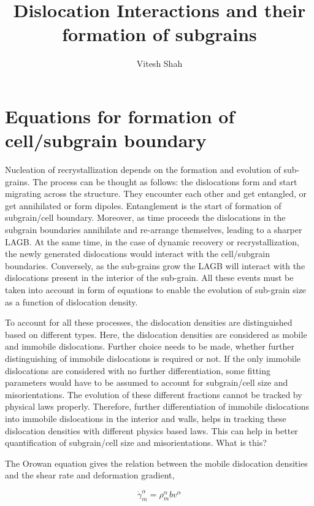 \documentclass[a4paper,11pt]{article}
\author{Vitesh Shah}
\title{Dislocation Interactions and their formation of subgrains}
\begin{document}
\maketitle
\section{Equations for formation of cell/subgrain boundary} \fussy

\par Nucleation of recrystallization depends on the formation and evolution of sub-grains. The process can be thought as follows: the dislocations form and start migrating across the structure. They encounter each other and get entangled, or get annihilated or form dipoles. Entanglement is the start of formation of subgrain/cell boundary. Moreover, as time proceeds the dislocations in the subgrain boundaries annihilate and re-arrange themselves, leading to a sharper LAGB. At the same time, in the case of dynamic recovery or recrystallization, the newly generated dislocations would interact with the cell/subgrain boundaries. Conversely, as the sub-grains grow the LAGB will interact with the dislocations present in the interior of the sub-grain. All these events must be taken into account in form of equations to enable the evolution of sub-grain size as a function of dislocation density. \par

To account for all these processes, the dislocation densities are distinguished based on different types. 
Here, the dislocation densities are considered as mobile and immobile dislocations. 
Further choice needs to be made, whether further distinguishing of immobile dislocations is required or not. 
If the only immobile dislocations are considered with no further differentiation, some fitting parameters would have to be assumed to account for subgrain/cell size and misorientations. 
The evolution of these different fractions cannot be tracked by physical laws properly. 
Therefore, further differentiation of immobile dislocations into immobile dislocations in the interior and walls, helps in tracking these dislocation densities with different physics based laws. 
This can help in better quantification of subgrain/cell size and misorientations. What is this?

The Orowan equation gives the relation between the mobile dislocation densities and the shear rate and deformation gradient,

\begin{equation} 
\dot{\gamma}_m^\alpha = \rho_m^\alpha b v^\alpha \label{eq:1}
\end{equation}
\end{document}
